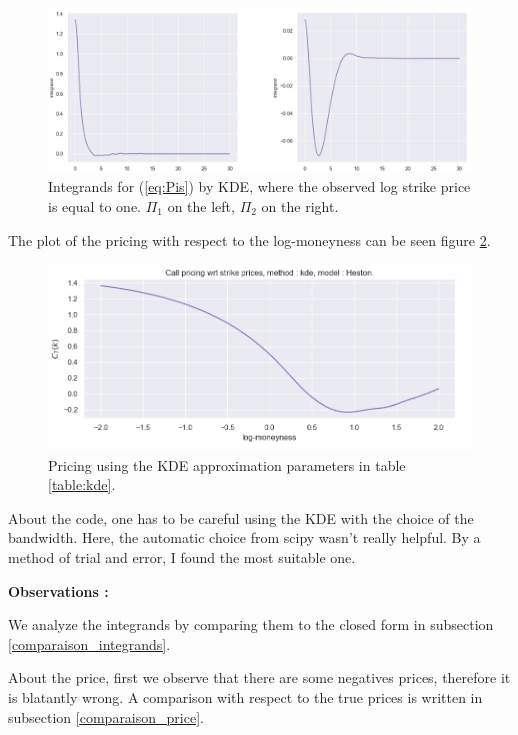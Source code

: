 \begin{figure}
\centering
\includegraphics[width = 0.8 \textwidth]{../addition_part/images/integration_fft/kde_integrand.png}
\caption{Integrands for (\ref{eq:Pis}) by KDE, where the observed log strike price is equal to one. $\Pi_1$ on the left, $\Pi_2$ on the right.}
\label{fig:integrand_kde}
\end{figure}

The plot of the pricing with respect to the log-moneyness can be seen figure \ref{fig:price_kde}.


\begin{figure}
\centering
\includegraphics[width = 0.7 \textwidth]{../addition_part/images/integration_fft/pricing_kde.png}
\caption{Pricing using the KDE approximation parameters in table \ref{table:kde}.}
\label{fig:price_kde}
\end{figure}

About the code, one has to be careful using the KDE with the choice of the bandwidth. Here, the automatic choice from scipy wasn't really helpful. By a method of trial and error, I found the most suitable one.

\textbf{Observations : }

We analyze the integrands by comparing them to the closed form in subsection \ref{comparaison_integrands}.

About the price, first we observe that there are some negatives prices, therefore it is blatantly wrong. A comparison with respect to the true prices is written in subsection \ref{comparaison_price}.












